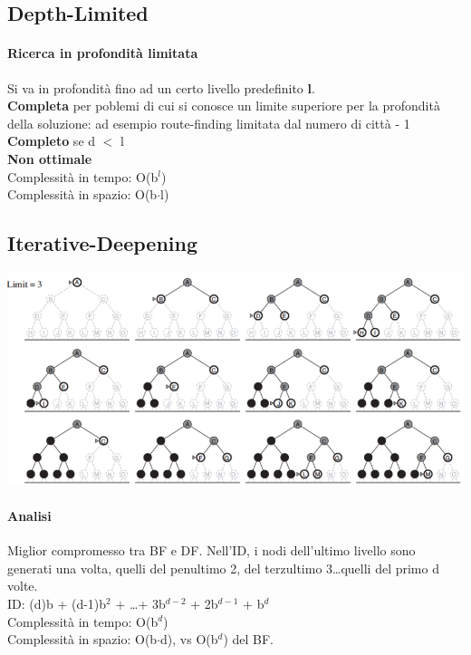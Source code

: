 \documentclass[10pt]{book}
\begin{document}
\subsection{Depth-Limited}
\paragraph{Ricerca in profondità limitata} Si va in profondità fino ad un certo livello predefinito \textbf{l}.\\
\textbf{Completa} per poblemi di cui si conosce un limite superiore per la profondità della soluzione: ad esempio route-finding limitata dal numero di città - 1\\
\textbf{Completo} se d $<$ l\\
\textbf{Non ottimale}\\
Complessità in tempo: O(b$^l$)\\
Complessità in spazio: O(b$\cdot$l)
\pagebreak
\subsection{Iterative-Deepening}
\begin{center}
	\includegraphics[scale=0.7]{id.png}
\end{center}
\paragraph{Analisi} Miglior compromesso tra BF e DF. Nell'ID, i nodi dell'ultimo livello sono generati una volta, quelli del penultimo 2, del terzultimo 3\ldots quelli del primo d volte.\\ID: (d)b + (d-1)b$^2$ + \ldots + 3b$^{d-2}$ + 2b$^{d-1}$ + b$^d$\\
Complessità in tempo: O(b$^d$)\\
Complessità in spazio: O(b$\cdot$d), vs O(b$^d$) del BF.
\end{document}
